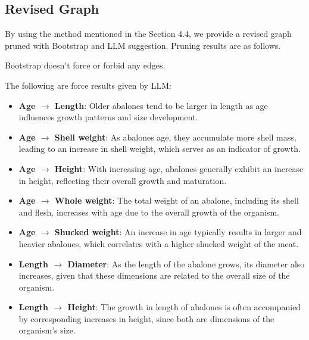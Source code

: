 \documentclass{article}
\begin{document}
\subsection{Revised Graph}

\begin{minipage}[t]{0.6\linewidth} 
By using the method mentioned in the Section 4.4, we provide a revised graph pruned with Bootstrap and LLM suggestion.
Pruning results are as follows.
        
Bootstrap doesn't force or forbid any edges.
            
The following are force results given by LLM:
            
\begin{itemize}        
\item \textbf{Age $\rightarrow$ Length}: Older abalones tend to be larger in length as age influences growth patterns and size development.
                
\item \textbf{Age $\rightarrow$ Shell weight}: As abalones age, they accumulate more shell mass, leading to an increase in shell weight, which serves as an indicator of growth.
                
\item \textbf{Age $\rightarrow$ Height}: With increasing age, abalones generally exhibit an increase in height, reflecting their overall growth and maturation.
                
\item \textbf{Age $\rightarrow$ Whole weight}: The total weight of an abalone, including its shell and flesh, increases with age due to the overall growth of the organism.
                
\item \textbf{Age $\rightarrow$ Shucked weight}: An increase in age typically results in larger and heavier abalones, which correlates with a higher shucked weight of the meat.
                
\item \textbf{Length $\rightarrow$ Diameter}: As the length of the abalone grows, its diameter also increases, given that these dimensions are related to the overall size of the organism.
                
\item \textbf{Length $\rightarrow$ Height}: The growth in length of abalones is often accompanied by corresponding increases in height, since both are dimensions of the organism's size.
                

\end{itemize}
\end{minipage}
\end{document}
